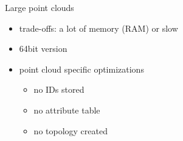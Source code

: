 \documentclass[xcolor={dvipsnames,usenames},beamer,aspectratio=169]{beamer}
\begin{document}
\begin{frame}{Large point clouds}

\begin{itemize}
  \item trade-offs: a lot of memory (RAM) or slow
  \item 64bit version
  \item point cloud specific optimizations
  \begin{itemize}
  \item no IDs stored
  \item no attribute table
  \item no topology created
  \end{itemize}
\end{itemize}

\end{frame}
\end{document}
